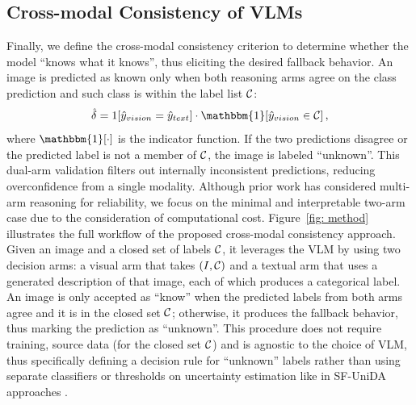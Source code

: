 \documentclass[10pt]{article} %
\begin{document}
\subsection{Cross-modal Consistency of VLMs}
Finally, we define the cross-modal consistency criterion to determine whether the model ``knows what it knows'', thus eliciting the desired fallback behavior.
An image is predicted as known only when both reasoning arms agree on the class prediction and such class is within the label list ${\cal C}$:
%
\begin{equation}
\hat{\delta} =1[\hat{y}_{vision}=\hat{y}_{text}] \cdot \mathbbm{1}[\hat{y}_{vision} \in {\cal C}] \,,
\end{equation}
%
where $\mathbbm{1}[\cdot]$ is the indicator function.
If the two predictions disagree or the predicted label is not a member of ${\cal C}$, the image is labeled ``unknown''.
This dual-arm validation filters out internally inconsistent predictions, reducing overconfidence from a single modality.
Although prior work \citep{manakul2023selfcheckgpt, wang2022self} has considered multi-arm reasoning for reliability, we focus on the minimal and interpretable two-arm case due to the consideration of computational cost.
Figure~\ref{fig: method} illustrates the full workflow of the proposed cross-modal consistency approach.
Given an image and a closed set of labels ${\cal C}$, it leverages the VLM by using two decision arms: a visual arm that takes $(I, {\cal C})$ and a textual arm that uses a generated description of that image, each of which produces a categorical label.
An image is only accepted as ``know'' when the predicted labels from both arms agree and it is in the closed set ${\cal C}$; otherwise, it produces the fallback behavior, thus marking the prediction as ``unknown''.
This procedure does not require training, source data (for the closed set ${\cal C}$) and is agnostic to the choice of VLM, thus specifically defining a decision rule for ``unknown'' labels rather than using separate classifiers \citep{qu2023upcycling}  or thresholds on uncertainty estimation like in SF-UniDA approaches \citep{qu2023upcycling, liang2021umad}.
\end{document}
